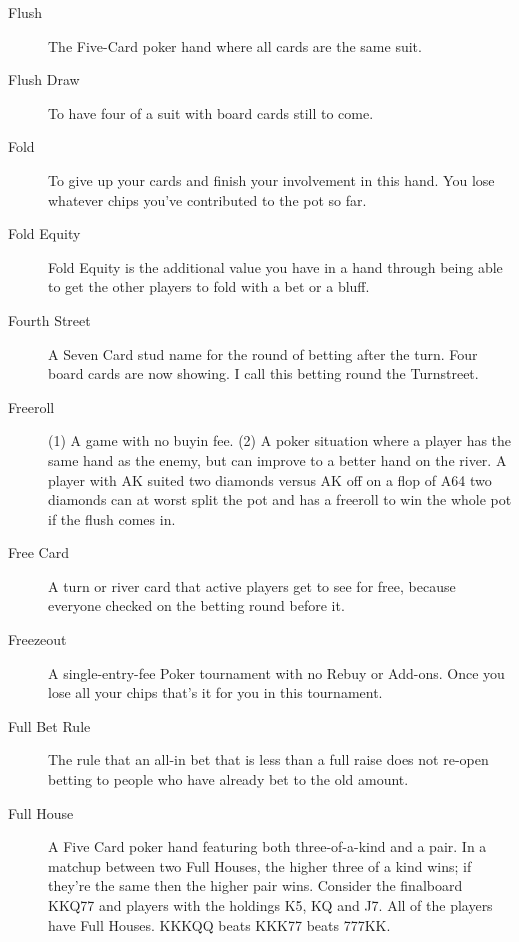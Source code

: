 \begin{description}
\item[Flush] The Five-Card poker hand where all cards are the same
suit.

\item[Flush Draw] To have four of a suit with board cards still to
come.

\item[Fold] To give up your cards and finish your involvement in this
hand. You lose whatever chips you've contributed to the pot so far.

\item[Fold Equity] Fold Equity is the additional value you have in a
hand through being able to get the other players to fold with a bet or
a bluff.

\item[Fourth Street] A Seven Card stud name for the round of betting
after the turn. Four board cards are now showing. I call this betting
round the Turnstreet.

\item[Freeroll] (1) A game with no buyin fee. (2) A poker situation
where a player has the same hand as the enemy, but can improve to a
better hand on the river. A player with AK suited two diamonds versus
AK off on a flop of A64 two diamonds can at worst split the pot and
has a freeroll to win the whole pot if the flush comes in.

\item[Free Card] A turn or river card that active players get to see
for free, because everyone checked on the betting round before it.

\item[Freezeout] A single-entry-fee Poker tournament with no Rebuy or
Add-ons. Once you lose all your chips that's it for you in this
tournament.


\item[Full Bet Rule] The rule that an all-in bet that is less than a
full raise does not re-open betting to people who have already bet to
the old amount.

\item[Full House] A Five Card poker hand featuring both
three-of-a-kind and a pair. In a matchup between two Full Houses, the
higher three of a kind wins; if they're the same then the higher pair
wins. Consider the finalboard KKQ77 and players with the holdings K5,
KQ and J7. All of the players have Full Houses. KKKQQ beats KKK77
beats 777KK.


\end{description}
